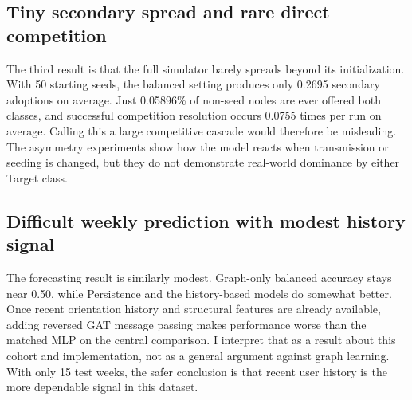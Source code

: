 \documentclass[11pt,a4paper]{article}
\begin{document}
\subsection{Tiny secondary spread and rare direct competition}
The third result is that the full simulator barely spreads beyond its initialization. With 50 starting seeds, the balanced setting produces only 0.2695 secondary adoptions on average. Just 0.05896\% of non-seed nodes are ever offered both classes, and successful competition resolution occurs 0.0755 times per run on average. Calling this a large competitive cascade would therefore be misleading. The asymmetry experiments show how the model reacts when transmission or seeding is changed, but they do not demonstrate real-world dominance by either Target class.

\subsection{Difficult weekly prediction with modest history signal}
The forecasting result is similarly modest. Graph-only balanced accuracy stays near 0.50, while Persistence and the history-based models do somewhat better. Once recent orientation history and structural features are already available, adding reversed GAT message passing makes performance worse than the matched MLP on the central comparison. I interpret that as a result about this cohort and implementation, not as a general argument against graph learning. With only 15 test weeks, the safer conclusion is that recent user history is the more dependable signal in this dataset.
\end{document}
